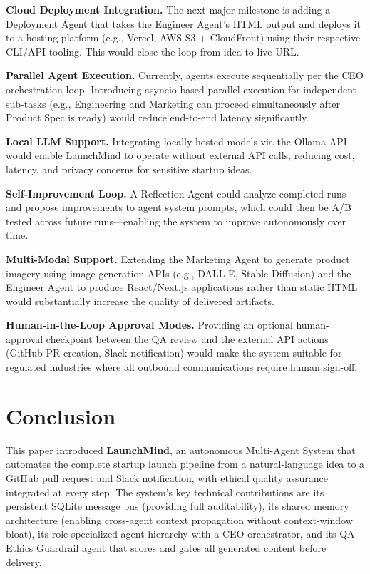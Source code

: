 \documentclass[conference]{IEEEtran}
\begin{document}
\textbf{Cloud Deployment Integration.} The next major milestone is adding a Deployment Agent that takes the Engineer Agent's HTML output and deploys it to a hosting platform (e.g., Vercel, AWS S3 + CloudFront) using their respective CLI/API tooling. This would close the loop from idea to live URL.

\textbf{Parallel Agent Execution.} Currently, agents execute sequentially per the CEO orchestration loop. Introducing asyncio-based parallel execution for independent sub-tasks (e.g., Engineering and Marketing can proceed simultaneously after Product Spec is ready) would reduce end-to-end latency significantly.

\textbf{Local LLM Support.} Integrating locally-hosted models via the Ollama API would enable LaunchMind to operate without external API calls, reducing cost, latency, and privacy concerns for sensitive startup ideas.

\textbf{Self-Improvement Loop.} A Reflection Agent could analyze completed runs and propose improvements to agent system prompts, which could then be A/B tested across future runs—enabling the system to improve autonomously over time.

\textbf{Multi-Modal Support.} Extending the Marketing Agent to generate product imagery using image generation APIs (e.g., DALL-E, Stable Diffusion) and the Engineer Agent to produce React/Next.js applications rather than static HTML would substantially increase the quality of delivered artifacts.

\textbf{Human-in-the-Loop Approval Modes.} Providing an optional human-approval checkpoint between the QA review and the external API actions (GitHub PR creation, Slack notification) would make the system suitable for regulated industries where all outbound communications require human sign-off.

\section{Conclusion}
\label{sec:conclusion}

This paper introduced \textbf{LaunchMind}, an autonomous Multi-Agent System that automates the complete startup launch pipeline from a natural-language idea to a GitHub pull request and Slack notification, with ethical quality assurance integrated at every step. The system's key technical contributions are its persistent SQLite message bus (providing full auditability), its shared memory architecture (enabling cross-agent context propagation without context-window bloat), its role-specialized agent hierarchy with a CEO orchestrator, and its QA Ethics Guardrail agent that scores and gates all generated content before delivery.
\end{document}
